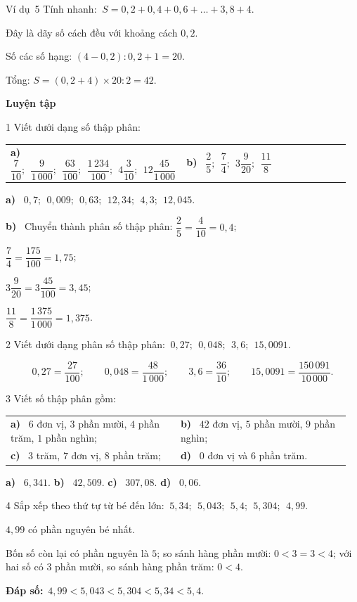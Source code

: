 \documentclass[11pt]{article}
\makeatletter
\newif\ifsol \solfalse
\renewcommand{\arraystretch}{1.35}
\providecommand{\AnsWord}{Đáp số}
\newcommand{\dapso}[1]{\par\textbf{\AnsWord:}\ #1}
\newcommand{\guide}{\par\vspace{4pt}{\bfseries\color{tmBlue}\GuideWord}\par\vspace{3pt}\nopagebreak}
\newcommand{\probsol}[1]{%
  \begin{lrbox}{\solmeasure}\begin{minipage}{\dimexpr\linewidth-24pt\relax}#1\end{minipage}\end{lrbox}%
  \ifsol
    \begin{solbox}#1\end{solbox}%
  \else
    \setlength{\solht}{\dimexpr\ht\solmeasure+\dp\solmeasure+0.85cm\relax}%
    \ifdim\solht<1.35cm\setlength{\solht}{1.35cm}\fi
    \begin{tcolorbox}[colback=white,colframe=Line,boxrule=0.8pt,arc=5pt,
      left=8pt,right=8pt,top=4pt,bottom=4pt,height=\solht]{\footnotesize\color{Slate}\itshape\WorkWord}\end{tcolorbox}%
  \fi}
\newcommand{\dividerbar}[1]{\par\vspace{0.6em}\noindent
  \begin{tcolorbox}[enhanced,frame hidden,interior hidden,borderline west={5pt}{0pt}{ProbBlue},
    colback=white,left=12pt,right=12pt,top=5pt,bottom=5pt,arc=4pt]
  {\large\bfseries\color{ProbBlue} #1}\end{tcolorbox}\vspace{0.4em}}
\newcommand{\pa}[1]{\textbf{#1)}\ }
\newenvironment{cols2}{\par\vspace{3pt}\noindent\setlength{\tabcolsep}{0pt}\renewcommand{\arraystretch}{1.3}%
  \begin{tabular}{@{}>{\raggedright\arraybackslash\rule{0pt}{4.4ex}}p{0.48\linewidth}<{\rule[-2.3ex]{0pt}{0pt}}@{\hspace{0.03\linewidth}}>{\raggedright\arraybackslash\rule{0pt}{4.4ex}}p{0.48\linewidth}<{\rule[-2.3ex]{0pt}{0pt}}@{}}}%
  {\end{tabular}\par}
\newcommand{\gap}{\vspace{0.3cm}}
\def\GuideWord{Hướng dẫn giải.}
\def\WorkWord{Bài làm:}
\def\AnsWord{Đáp số}
\def\ExWord{Ví dụ}
\makeatother
\begin{document}
\gap
\begin{exbox}{\ExWord\ 5}
Tính nhanh: $\ S=0{,}2+0{,}4+0{,}6+\dots+3{,}8+4$.
\guide
Đây là dãy số cách đều với khoảng cách $0{,}2$.\par Số các số hạng: $(4-0{,}2):0{,}2+1=20$.\par
Tổng: $S=(0{,}2+4)\times20:2=42$.
\end{exbox}
\dividerbar{Luyện tập}
\begin{probbox}{1}{\relax}
Viết dưới dạng số thập phân:
\begin{cols2}
\pa{a} $\dfrac7{10};\ \ \dfrac9{1\,000};\ \ \dfrac{63}{100};\ \ \dfrac{1\,234}{100};\ \ 4\dfrac3{10};\ \ 12\dfrac{45}{1\,000}$ & \pa{b} $\dfrac25;\ \ \dfrac74;\ \ 3\dfrac9{20};\ \ \dfrac{11}8$
\end{cols2}
\end{probbox}
\probsol{
\pa{a} $0{,}7;\ \ 0{,}009;\ \ 0{,}63;\ \ 12{,}34;\ \ 4{,}3;\ \ 12{,}045$.\par
\pa{b} Chuyển thành phân số thập phân: $\dfrac25=\dfrac4{10}=0{,}4$;\par $\dfrac74=\dfrac{175}{100}=1{,}75$;\par $3\dfrac9{20}=3\dfrac{45}{100}=3{,}45$;\par $\dfrac{11}8=\dfrac{1\,375}{1\,000}=1{,}375$.
}
\gap
\begin{probbox}{2}{\relax}
Viết dưới dạng phân số thập phân: $\ 0{,}27;\ \ 0{,}048;\ \ 3{,}6;\ \ 15{,}0091$.
\end{probbox}
\probsol{
\[0{,}27=\frac{27}{100};\qquad0{,}048=\frac{48}{1\,000};\qquad3{,}6=\frac{36}{10};\qquad15{,}0091=\frac{150\,091}{10\,000}.\]
}
\gap
\begin{probbox}{3}{\relax}
Viết số thập phân gồm:
\begin{cols2}
\pa{a} $6$ đơn vị, $3$ phần mười, $4$ phần trăm, $1$ phần nghìn; & \pa{b} $42$ đơn vị, $5$ phần mười, $9$ phần nghìn;\\
\pa{c} $3$ trăm, $7$ đơn vị, $8$ phần trăm; & \pa{d} $0$ đơn vị và $6$ phần trăm.
\end{cols2}
\end{probbox}
\probsol{
\pa{a} $6{,}341$. \qquad \pa{b} $42{,}509$. \qquad \pa{c} $307{,}08$. \qquad \pa{d} $0{,}06$.
}
\gap
\begin{probbox}{4}{\relax}
Sắp xếp theo thứ tự từ bé đến lớn: $\ 5{,}34;\ \ 5{,}043;\ \ 5{,}4;\ \ 5{,}304;\ \ 4{,}99$.
\end{probbox}
\probsol{
$4{,}99$ có phần nguyên bé nhất.\par Bốn số còn lại có phần nguyên là $5$; so sánh hàng phần mười: $0<3=3<4$; với hai số có $3$ phần mười, so sánh hàng phần trăm: $0<4$.
\dapso{$4{,}99<5{,}043<5{,}304<5{,}34<5{,}4$.}}
\end{document}
